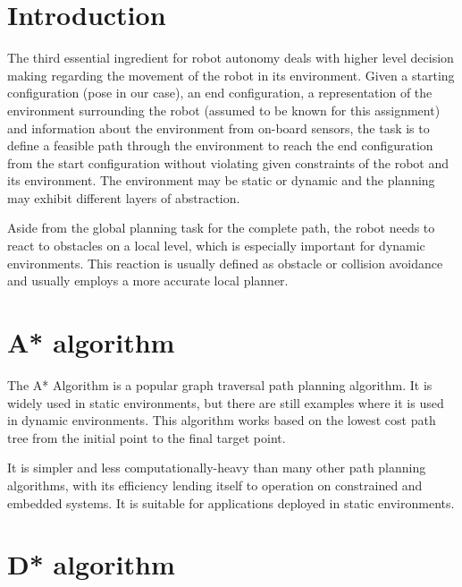 \documentclass[12pt, a4paper, onecolumn]{article}
\begin{document}
\maketitle

\section{Introduction}

The third essential ingredient for robot autonomy deals with higher level decision making regarding the movement of the robot in its environment. Given a starting configuration (pose in our case), an end configuration, a representation of the environment surrounding the robot (assumed to be known for this assignment) and information about the environment from on-board sensors, the task is to define a feasible path through the environment to reach the end configuration from the start configuration without violating given constraints of the robot and its environment. The environment may be static or dynamic and the planning may exhibit different layers of abstraction. 

Aside from the global planning task for the complete path, the robot needs to react to obstacles on a local level, which is especially important for dynamic environments. This reaction is usually defined as obstacle or collision avoidance and usually employs a more accurate local planner.

\section{A* algorithm}

The A* Algorithm is a popular graph traversal path planning algorithm. It is widely used in static environments, but there are still examples where it is used in dynamic environments. This algorithm works based on the lowest cost path tree from the initial point to the final target point. \cite{Karur21}

It is simpler and less computationally-heavy than many other path planning algorithms, with its efficiency lending itself to operation on constrained and embedded systems. It is
suitable for applications deployed in static environments. \cite{Karur21}

\section{D* algorithm}
\end{document}
